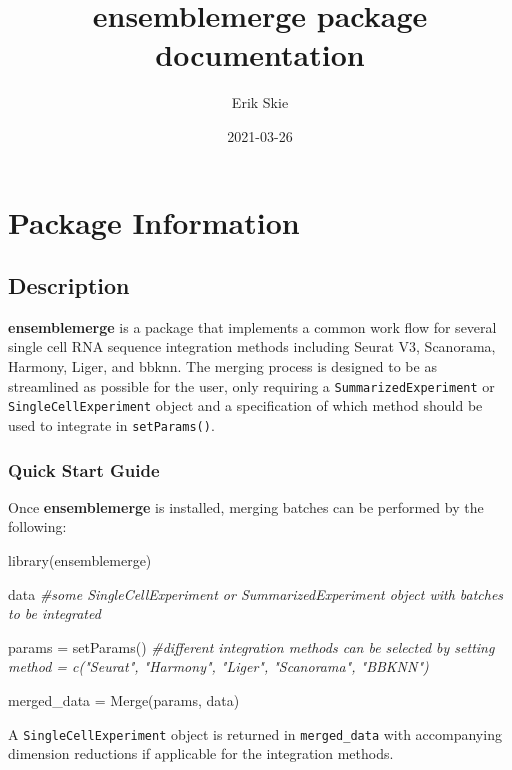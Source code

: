 \documentclass[
]{book}
\title{ensemblemerge package documentation}
\author{Erik Skie}
\date{2021-03-26}
\newenvironment{Shaded}{\begin{snugshade}}{\end{snugshade}}
\newcommand{\CommentTok}[1]{\textcolor[rgb]{0.56,0.35,0.01}{\textit{#1}}}
\newcommand{\FunctionTok}[1]{\textcolor[rgb]{0.00,0.00,0.00}{#1}}
\newcommand{\NormalTok}[1]{#1}
\newcommand{\OtherTok}[1]{\textcolor[rgb]{0.56,0.35,0.01}{#1}}
\begin{document}
\maketitle

{
\setcounter{tocdepth}{1}
\tableofcontents
}
\hypertarget{package-information}{%
\chapter{Package Information}\label{package-information}}

\hypertarget{description}{%
\section{Description}\label{description}}

\textbf{ensemblemerge} is a package that implements a common work flow for several single cell RNA sequence integration methods including Seurat V3, Scanorama, Harmony, Liger, and bbknn. The merging process is designed to be as streamlined as possible for the user, only requiring a \texttt{SummarizedExperiment} or \texttt{SingleCellExperiment} object and a specification of which method should be used to integrate in \texttt{setParams()}.

\hypertarget{quick-start-guide}{%
\subsection{Quick Start Guide}\label{quick-start-guide}}

Once \textbf{ensemblemerge} is installed, merging batches can be performed by the following:

\begin{Shaded}
\begin{Highlighting}[]
\FunctionTok{library}\NormalTok{(ensemblemerge)}

\NormalTok{data }\CommentTok{\#some SingleCellExperiment or SummarizedExperiment object with batches to be integrated}

\NormalTok{params }\OtherTok{=} \FunctionTok{setParams}\NormalTok{() }\CommentTok{\#different integration methods can be selected by setting method = c("Seurat", "Harmony", "Liger", "Scanorama", "BBKNN")}

\NormalTok{merged\_data }\OtherTok{=} \FunctionTok{Merge}\NormalTok{(params, data)}
\end{Highlighting}
\end{Shaded}

A \texttt{SingleCellExperiment} object is returned in \texttt{merged\_data} with accompanying dimension reductions if applicable for the integration methods.
\end{document}
